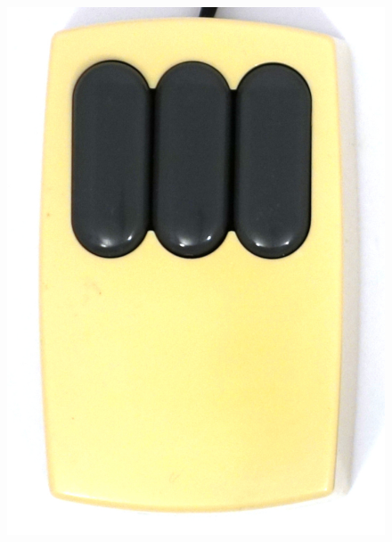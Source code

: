 \documentclass[11pt, a4paper]{article}
\begin{document}
\begin{figure}[h]
    \centering
    \includegraphics[scale=0.5]{1981_xerox_alto_mouse/top_30.jpg}

\end{figure}
\end{document}
